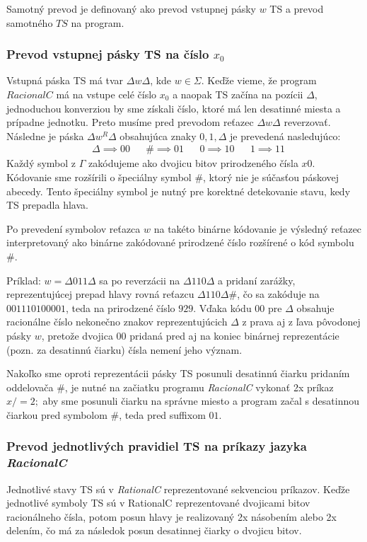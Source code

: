 \documentclass[10pt]{article}
\begin{document}
Samotný prevod je definovaný ako prevod vstupnej pásky $w$ TS a prevod samotného $TS$ na program.
\subsubsection*{Prevod vstupnej pásky TS na číslo $x_0$}
    Vstupná páska TS má tvar $\Delta w \Delta$, kde $w \in \Sigma$. Keďže vieme, že program
    $RacionalC$ má na vstupe celé číslo $x_0$ a naopak TS začína na pozícii $\Delta$, jednoduchou konverziou by sme získali číslo,
    ktoré má len desatinné miesta a prípadne jednotku. Preto musíme
    pred prevodom reťazec $\Delta w \Delta$ reverzovať. 
    Následne je páska $\Delta w^R \Delta$ obsahujúca znaky $0,1,\Delta$ je prevedená nasledujúco:
    \begin{align*}
        &\Delta \implies 00 &  & \#  \implies 01 &
        &0 \implies 10 &  &1 \implies 11 
    \end{align*}
    Každý symbol z $\Gamma$ zakódujeme ako dvojicu bitov prirodzeného čísla $x0$.
    Kódovanie sme rozšírili o špeciálny symbol $\#$, ktorý nie je súčasťou páskovej abecedy.
    Tento špeciálny symbol je nutný pre korektné detekovanie stavu, kedy TS prepadla hlava.

    Po prevedení symbolov reťazca $w$ na takéto binárne kódovanie je výsledný reťazec interpretovaný ako
    binárne zakódované prirodzené číslo rozšírené o kód symbolu $\#$.

    Príklad: $w = \Delta011\Delta$ sa po reverzácii na $\Delta110\Delta$ a pridaní zarážky,
    reprezentujúcej prepad hlavy rovná reťazcu $\Delta110\Delta \#$, čo sa zakóduje na $00 11 10 10 00
    01$, teda na prirodzené číslo $929$. Vďaka kódu $00$ pre $\Delta$ obsahuje racionálne číslo nekonečno znakov
    reprezentujúcich $\Delta$ z prava aj z ľava pôvodonej pásky $w$, pretože dvojica 00 pridaná
    pred aj na koniec binárnej reprezentácie (pozn. za desatinnú čiarku) čísla nemení jeho význam.

    Nakoľko sme oproti reprezentácii pásky TS posunuli desatinnú čiarku pridaním oddelovača $\#$, je
    nutné na začiatku programu \textit{RacionalC} vykonať 2x príkaz $x /= 2;$ aby sme posunuli čiarku na
    správne miesto a program začal s desatinnou čiarkou pred symbolom $\#$, teda pred suffixom $01$.

\subsubsection*{Prevod jednotlivých pravidiel TS na príkazy jazyka \textit{RacionalC}}
    Jednotlivé stavy TS sú v \textit{RationalC} reprezentované sekvenciou príkazov. 
    Keďže jednotlivé symboly TS sú v RationalC reprezentované dvojicami bitov racionálneho čísla, potom posun hlavy je
    realizovaný 2x násobením alebo 2x delením, čo má za následok posun desatinnej čiarky o
    dvojicu bitov.
\end{document}
